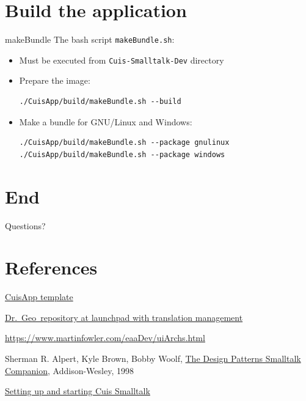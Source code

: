\documentclass{beamer}
\newcommand{\drgeo}{Dr.~Geo}
\begin{document}
\begin{lstlisting}[language=Smalltalk]
\end{lstlisting}

\section{Build the application}
\begin{frame}[fragile]{makeBundle}
  The bash script \texttt{makeBundle.sh}:
  \begin{itemize}
  \item Must be executed from \texttt{Cuis-Smalltalk-Dev} directory
  \item Prepare the image:
\begin{verbatim}
./CuisApp/build/makeBundle.sh --build
\end{verbatim}
  \item Make a bundle for GNU/Linux and Windows:
\begin{verbatim}
./CuisApp/build/makeBundle.sh --package gnulinux
./CuisApp/build/makeBundle.sh --package windows
\end{verbatim}
  \end{itemize}
\end{frame}  

\section*{End}
\begin{frame}
  \begin{center}
    \fontsize{16pt}{8pt}\selectfont

  Questions?
\end{center}
\end{frame}
\section{References}
\begin{frame}
  \fontsize{10pt}{8pt}\selectfont
  \begin{thebibliography}{99}

    \href{https://github.com/hilaire/CuisApp}{CuisApp template}

   \href{https://launchpad.net/drgeo}{\drgeo\
      repository at launchpad with translation management}

    \href{GUI Architectures}{https://www.martinfowler.com/eaaDev/uiArchs.html}
    
    Sherman R. Alpert, Kyle Brown, Bobby Woolf,
    \href{https://dl.acm.org/doi/book/10.5555/275616}{The Design
      Patterns Smalltalk Companion}, Addison-Wesley, 1998
    
    \href{https://github.com/Cuis-Smalltalk/Cuis-Smalltalk-Dev/blob/master/Documentation/GettingStarted.md}{Setting
      up and starting Cuis Smalltalk}

  \end{thebibliography}

  
\end{frame}
\end{document}
